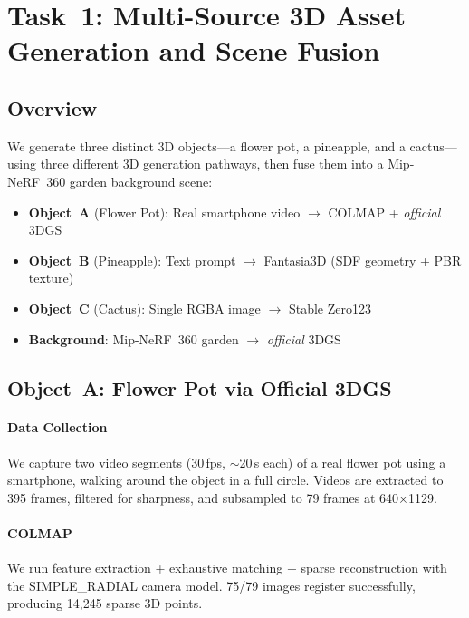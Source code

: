 \documentclass[10pt,twocolumn,letterpaper]{article}
\begin{document}
\section{Task~1: Multi-Source 3D Asset Generation and Scene Fusion}

\subsection{Overview}

We generate three distinct 3D objects---a flower pot, a pineapple, and a cactus---using three different 3D generation pathways, then fuse them into a Mip-NeRF~360 garden background scene:
\begin{itemize}
\item \textbf{Object~A} (Flower Pot): Real smartphone video $\to$ COLMAP + \emph{official} 3DGS
\item \textbf{Object~B} (Pineapple): Text prompt $\to$ Fantasia3D (SDF geometry + PBR texture)
\item \textbf{Object~C} (Cactus): Single RGBA image $\to$ Stable Zero123
\item \textbf{Background}: Mip-NeRF~360 garden $\to$ \emph{official} 3DGS
\end{itemize}

\subsection{Object~A: Flower Pot via Official 3DGS}

\paragraph{Data Collection} We capture two video segments (30\,fps, $\sim$20\,s each) of a real flower pot using a smartphone, walking around the object in a full circle. Videos are extracted to 395 frames, filtered for sharpness, and subsampled to 79 frames at 640$\times$1129.

\paragraph{COLMAP} We run feature extraction + exhaustive matching + sparse reconstruction with the SIMPLE\_RADIAL camera model. 75/79 images register successfully, producing 14{,}245 sparse 3D points.
\end{document}
